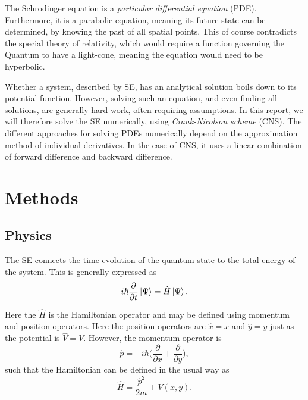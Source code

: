\documentclass[english,notitlepage,reprint,nofootinbib]{revtex4-1}  %
\begin{document}
The Schrodinger equation is a \textit{particular differential equation} (PDE). Furthermore, it is a parabolic equation, meaning its future state can be determined, by knowing the past of all spatial points. This of course contradicts the special theory of relativity, which would require a function governing the Quantum to have a light-cone, meaning the equation would need to be hyperbolic.

Whether a system, described by SE, has an analytical solution boils down to its potential function. However, solving such an equation, and even finding all solutions, are generally hard work, often requiring assumptions. In this report, we will therefore solve the SE numerically, using \textit{Crank-Nicolson scheme} (CNS). The different approaches for solving PDEs numerically depend on the approximation method of individual derivatives. In the case of CNS, it uses a linear combination of forward difference and backward difference.







\section{Methods}

\subsection{Physics}

The SE connects the time evolution of the quantum state to the total energy of the system. This is generally expressed as
$$ i \hbar \frac{\partial}{\partial t} \ket{\Psi} = \hat{H} \ket{\Psi} .$$

Here the $\hat{H}$ is the Hamiltonian operator and may be defined using momentum and position operators. Here the position operators are $\hat{x} = x$ and $\hat{y} = y$ just as the potential is $\hat{V} = V$. However, the momentum operator is 
$$\hat{p} =  -i \hbar \Big( \frac{\partial}{\partial x} + \frac{\partial}{\partial y} \Big),$$
such that the Hamiltonian can be defined in the usual way as 
$$\hat{H} = \frac{\hat{p} ^2}{2m} + V(x,y). $$
\end{document}
